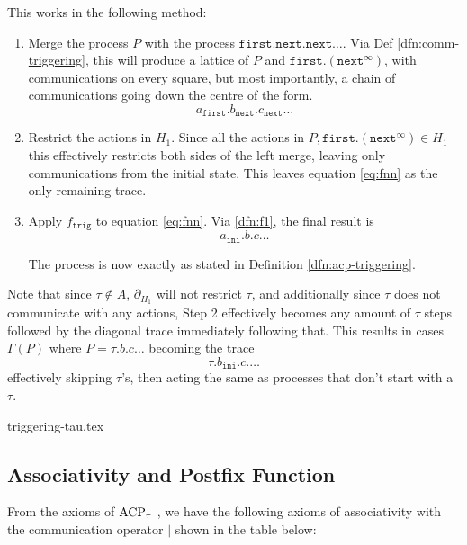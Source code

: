 \documentclass[../hons_project.tex]{subfiles}
\begin{document}
This works in the following method:
\vspace{-5pt}
\begin{enumerate}[label=\alph*)]
	\item Merge the process $P$ with the process $\mathtt{first}.\mathtt{next}.\mathtt{next}\dots$. Via Def \ref{dfn:comm-triggering}, this will produce a lattice of $P$ and $\mathtt{first}.(\mathtt{next}^{\infty})$, with communications on every square, but most importantly, a chain of communications going down the centre of the form.
	      \begin{equation}\label{eq:fnn}
		      a_{\mathtt{first}}. b_{\mathtt{next}} . c_{\mathtt{next}} \dots
	      \end{equation}
	\item Restrict the actions in $H_{1}$. Since all the actions in $P, \mathtt{first}.(\mathtt{next}^{\infty}) \in H_{1}$ this effectively restricts both sides of the left merge, leaving only communications from the initial state. This leaves equation \ref{eq:fnn} as the only remaining trace.
	\item Apply $f_{\mathtt{trig}}$ to equation \ref{eq:fnn}. Via \ref{dfn:f1}, the final result is
	      \begin{equation}\label{eq:gamma-result}
		      a_{\mathtt{ini}}. b . c \dots
	      \end{equation}

	      The process is now exactly as stated in Definition \ref{dfn:acp-triggering}.
\end{enumerate}
Note that since $\tau\not\in A$, $\partial_{H_{1}}$ will not restrict $\tau$, and additionally since $\tau$ does not communicate with any actions, Step 2 effectively becomes any amount of $\tau$ steps followed by the diagonal trace immediately following that. This results in cases $\Gamma(P)$ where $P = \tau.b.c\dots$ becoming the trace
\[\tau.b_{\mathtt{ini}}.c.\dots\]
effectively skipping $\tau$'s, then acting the same as processes that don't start with a $\tau$.

{triggering-tau.tex}

\newpage
\subsection{Associativity and Postfix Function}
From the axioms of $\mathrm{ACP}_{\tau}$ \citep{bergstraACPtUniversalAxiom1989}, we have the following axioms of associativity with the communication operator $\mid$ shown in the table below:
\end{document}
